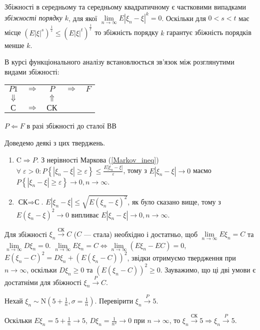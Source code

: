 \begin{remark}
    Збіжності в середньому та середньому квадратичному є частковими випадками \emph{збіжності порядку $k$}, для якої
$\underset{n \to \infty}{\lim} E|\xi_n - \xi|^k = 0$. Оскільки 
для $0 < s < t$ має місце
$( E \left| \xi\right|^s)^{\frac{1}{s}} \leq ( E \left| \xi\right|^t)^{\frac{1}{t}}$
то збіжність порядку $k$ гарантує збіжність порядків менше $k$.
\end{remark}
В курсі функціонального аналізу встановлюється зв'язок між розглянутими видами збіжності:
\begin{center}
    \begin{tabular}{c c c c c}
        $P1$ & $\Rightarrow$ & $P$ & $\Rightarrow$ & $F$ \\
        $\Downarrow$ & & $\Uparrow$ & & \\
        $\text{С}$ & $\Rightarrow$ & $\text{СК}$ & & \\
    \end{tabular}

    $P \Leftarrow F$ в разі збіжності до сталої ВВ
\end{center}
Доведемо деякі з цих тверджень.
\begin{enumerate}
    \item $\text{C} \Rightarrow P$. З нерівності Маркова (\ref{Markov_ineq})
    $\forall \; \varepsilon > 0: P\left\{|\xi_n - \xi| \geq \varepsilon\right\} \leq \frac{E|\xi_n - \xi|}{\varepsilon}$, 
    тому з $E|\xi_n - \xi| \to 0$ маємо $P\left\{|\xi_n - \xi| \geq \varepsilon\right\} \to 0, n\to\infty$.
    \item $\text{СК} \Rightarrow \text{С}$. $E|\xi_n -\xi| \leq \sqrt{E(\xi_n - \xi)^2}$, як було сказано вище, тому з $E(\xi_n - \xi)^2 \to 0$
    випливає $E|\xi_n - \xi| \to 0, n\to\infty$. 
\end{enumerate}
Для збіжності $\xi_n \overset{\text{СК}}{\longrightarrow} C$ ($C$ --- стала) необхідно і достатньо, щоб
$\underset{n \to \infty}{\lim} E\xi_n = C$ та $\underset{n \to \infty}{\lim} D\xi_n = 0$.
$\underset{n \to \infty}{\lim} E\xi_n = C \Leftrightarrow \underset{n \to \infty}{\lim} (E\xi_n - EC) = 0$,
$E(\xi_n - C)^2 = D\xi_n + (E(\xi_n -C))^2$,
звідки отримуємо твердження при $n \to \infty$, оскільки $D\xi_n \geq 0$ та $(E(\xi_n -C))^2 \geq 0$.
Зауважимо, що ці дві умови є достатніми для збіжності $\xi_n \overset{P}{\longrightarrow} C$.
\begin{example}
    Нехай $\xi_n \sim \mathrm{N}\left(5 + \frac{1}{n}, \sigma = \frac{1}{n}\right)$. Перевірити $\xi_n \overset{P}{\longrightarrow} 5$.
    
    \noindent Оскільки $E\xi_n = 5+\frac{1}{n} \to 5$, $D\xi_n = \frac{1}{n^2} \to 0$ при $n \to \infty$,
    то $\xi_n \overset{\text{СК}}{\longrightarrow} 5 \Rightarrow \xi_n \overset{P}{\longrightarrow} 5$.
\end{example}